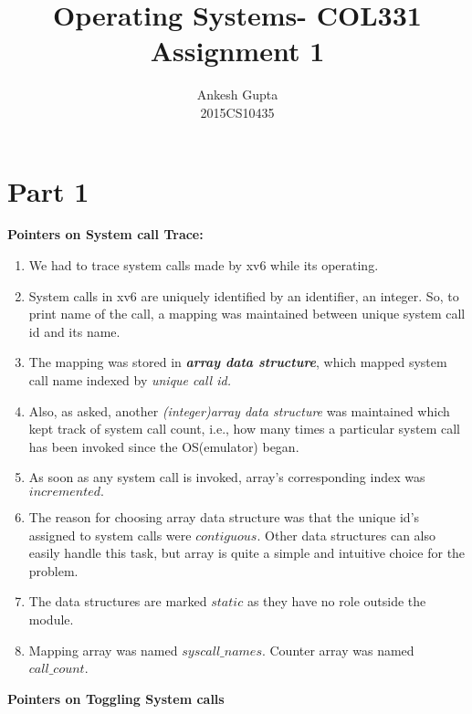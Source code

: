 \documentclass{article}
\newcommand{\bld}[1]{\textbf{#1}}
\newcommand{\ital}[1]{\textit{#1}}
\newcommand{\italb}[1]{\textbf{\textit{#1}}}
\begin{document}
\title{Operating Systems- COL331 \\Assignment 1}
\author{Ankesh Gupta\\2015CS10435}

\date{}
\maketitle

\section*{Part 1}
\bld{Pointers on System call Trace:}
\begin{enumerate}
	\item We had to trace system calls made by xv6 while its operating. 
	\item System calls in xv6 are uniquely identified by an identifier, an integer. So, to print name of the call, a mapping was maintained between unique system call id and its name. 
	\item The mapping was stored in \italb{array data structure}, which mapped system call name indexed by \ital{unique call id.}
	\item Also, as asked, another \ital{(integer)array data structure} was maintained which kept track of system call count, i.e., how many times a particular system call has been invoked since the OS(emulator) began.
	\item As soon as any system call is invoked, array's corresponding index was $incremented.$
	\item The reason for choosing array data structure was that the unique id's assigned to system calls were $contiguous$. Other data structures can also easily handle this task, but array is quite a simple and intuitive choice for the problem.
	\item The data structures are marked $static$ as they have no role outside the module.
	\item Mapping array was named $syscall\_names$. Counter array was named $call\_count$.
\end{enumerate}
\bld{Pointers on Toggling System calls}
\end{document}
